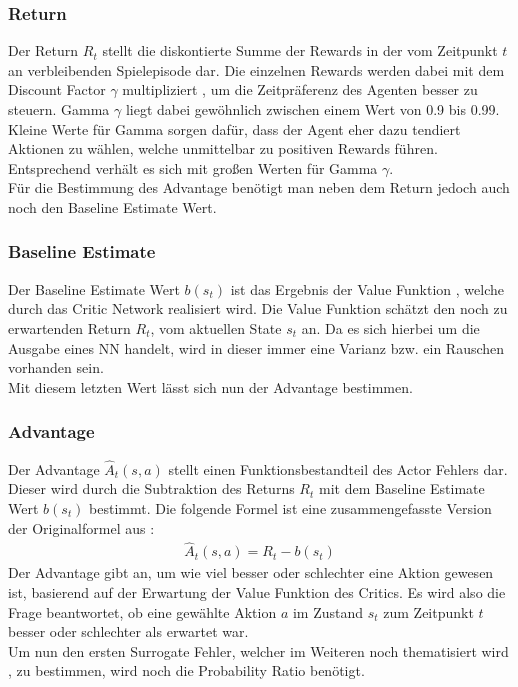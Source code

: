 \subsubsection{Return} \label{subsubsec:Grundlagen_Return}
Der Return $R_{t}$ stellt die diskontierte Summe der Rewards in der vom Zeitpunkt $t$ an verbleibenden Spielepisode dar. Die einzelnen Rewards werden dabei mit dem Discount Factor $\gamma$ multipliziert , um die Zeitpräferenz des Agenten besser zu steuern. Gamma $\gamma$ liegt dabei gewöhnlich zwischen einem Wert von 0.9 bis 0.99. Kleine Werte für Gamma sorgen dafür, dass der Agent eher dazu tendiert Aktionen zu wählen, welche unmittelbar zu positiven Rewards führen. Entsprechend verhält es sich mit großen Werten für Gamma $\gamma$. \citep[S. 42 ff.]{Sutton1998}\\
Für die Bestimmung des Advantage benötigt man neben dem Return jedoch auch noch den Baseline Estimate Wert.

\subsubsection{Baseline Estimate} \label{subsubsec:Grundlagen_Baseline_Estimate}
Der Baseline Estimate Wert $b(s_{t})$ ist das Ergebnis der Value Funktion , welche durch das Critic Network  realisiert wird. Die Value Funktion schätzt den noch zu erwartenden Return $R_{t}$, vom aktuellen State $s_{t}$ an. 
Da es sich hierbei um die Ausgabe eines NN handelt, wird in dieser immer eine Varianz bzw. ein Rauschen vorhanden sein. \citep[Kapitel 3]{asynchronous_methods_for_deep_rl}\\
Mit diesem letzten Wert lässt sich nun der Advantage bestimmen.

\subsubsection{Advantage} \label{subsubsec:Grundlagen_Advantage}
Der Advantage $\hat{A}_{t}(s, a)$ stellt einen Funktionsbestandteil des Actor Fehlers dar. Dieser wird durch die Subtraktion des Returns $R_{t}$ mit dem Baseline Estimate Wert $b(s_{t})$ bestimmt. Die folgende Formel  ist eine zusammengefasste Version der Originalformel aus \citep{PPO}:
\begin{align}
	\hat{A}_{t}(s, a) = R_{t} - b(s_{t})
	\label{eq:Grundlagen_Advantage}
\end{align}
Der Advantage gibt an, um wie viel besser oder schlechter eine Aktion gewesen ist, basierend auf der Erwartung der Value Funktion des Critics. 
Es wird also die Frage beantwortet, ob eine gewählte Aktion $a$ im Zustand $s_{t}$ zum Zeitpunkt $t$ besser oder schlechter als erwartet war. \citep[Kapitel 3]{asynchronous_methods_for_deep_rl}\\
Um nun den ersten Surrogate Fehler, welcher im Weiteren noch thematisiert wird , zu bestimmen, wird noch die Probability Ratio benötigt.

